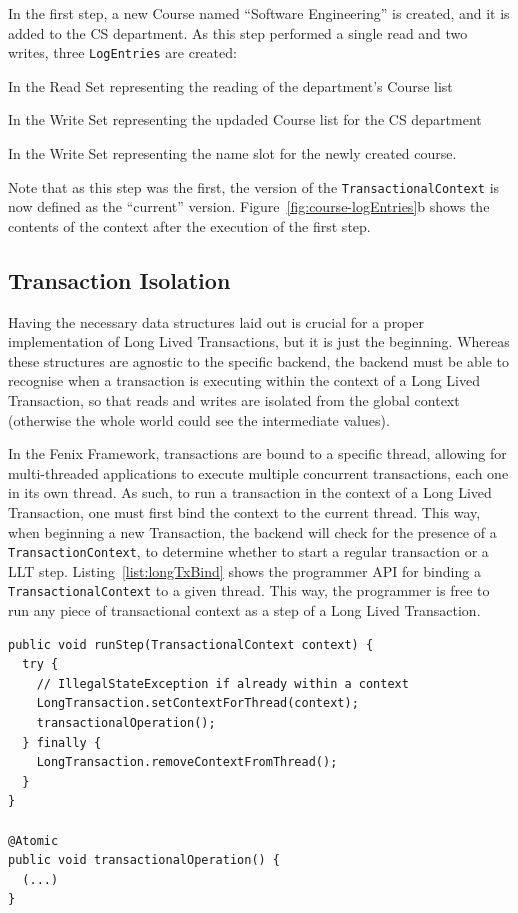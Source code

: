 In the first step, a new Course named ``Software Engineering'' is
created, and it is added to the CS department. As this step performed
a single read and two writes, three \texttt{LogEntries} are created: 
\begin{inparaenum}
\item In the Read Set representing the reading of the department's
  Course list
\item In the Write Set representing the updaded Course list for the CS
  department
\item In the Write Set representing the name slot for the newly
  created course.
\end{inparaenum}
Note that as this step was the first, the version of the
\texttt{TransactionalContext} is now defined as the ``current''
version. Figure~\ref{fig:course-logEntries}b shows the contents of the
context after the execution of the first step.

\subsection{Transaction Isolation}

Having the necessary data structures laid out is crucial for a proper
implementation of Long Lived Transactions, but it is just the
beginning. Whereas these structures are agnostic to the specific
backend, the backend must be able to recognise when a transaction is
executing within the context of a Long Lived Transaction, so that
reads and writes are isolated from the global context (otherwise the
whole world could see the intermediate values).

In the Fenix Framework, transactions are bound to a specific thread,
allowing for multi-threaded applications to execute multiple
concurrent transactions, each one in its own thread. As such, to run a
transaction in the context of a Long Lived Transaction, one must first
bind the context to the current thread. This way, when beginning a new
Transaction, the backend will check for the presence of a
\texttt{TransactionContext}, to determine whether to start a regular
transaction or a LLT step. Listing~\ref{list:longTxBind} shows the
programmer API for binding a \texttt{TransactionalContext} to a given
thread. This way, the programmer is free to run any piece of
transactional context as a step of a Long Lived Transaction.

\begin{lstlisting}[caption={Example of TransactionalContext usage},
  label={list:longTxBind},float]
public void runStep(TransactionalContext context) {
  try {
    // IllegalStateException if already within a context
    LongTransaction.setContextForThread(context);
    transactionalOperation();
  } finally {
    LongTransaction.removeContextFromThread();
  }
}

@Atomic
public void transactionalOperation() {
  (...)
}
\end{lstlisting}

